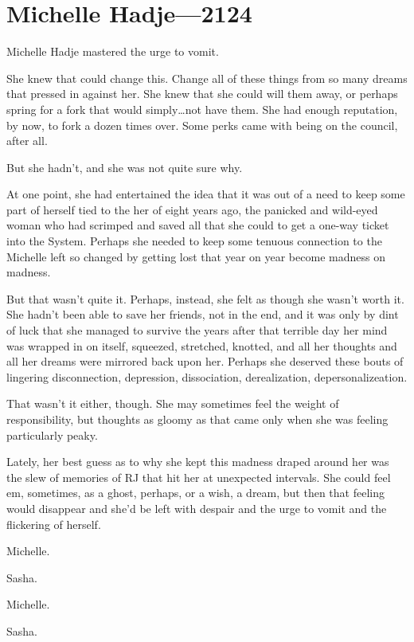 \hypertarget{michelle-hadjesasha-2124}{%
\chapter{Michelle Hadje—2124}\label{michelle-hadjesasha-2124}}

Michelle Hadje mastered the urge to vomit.

She knew that could change this. Change all of these things from so many dreams that pressed in against her. She knew that she could will them away, or perhaps spring for a fork that would simply\ldots not have them. She had enough reputation, by now, to fork a dozen times over. Some perks came with being on the council, after all.

But she hadn't, and she was not quite sure why.

At one point, she had entertained the idea that it was out of a need to keep some part of herself tied to the her of eight years ago, the panicked and wild-eyed woman who had scrimped and saved all that she could to get a one-way ticket into the System. Perhaps she needed to keep some tenuous connection to the Michelle left so changed by getting lost that year on year become madness on madness.

But that wasn't quite it. Perhaps, instead, she felt as though she wasn't worth it. She hadn't been able to save her friends, not in the end, and it was only by dint of luck that she managed to survive the years after that terrible day her mind was wrapped in on itself, squeezed, stretched, knotted, and all her thoughts and all her dreams were mirrored back upon her. Perhaps she deserved these bouts of lingering disconnection, depression, dissociation, derealization, depersonalizeation.

That wasn't it either, though. She may sometimes feel the weight of responsibility, but thoughts as gloomy as that came only when she was feeling particularly peaky.

Lately, her best guess as to why she kept this madness draped around her was the slew of memories of RJ that hit her at unexpected intervals. She could feel em, sometimes, as a ghost, perhaps, or a wish, a dream, but then that feeling would disappear and she'd be left with despair and the urge to vomit and the flickering of herself.

Michelle.

Sasha.

Michelle.

Sasha.

